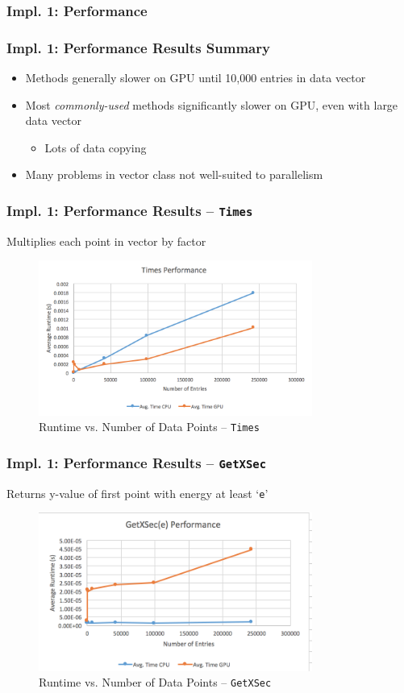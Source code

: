\documentclass{beamer}
\newcommand{\textapprox}{\raisebox{0.5ex}{\texttildelow}}
\begin{document}
\subsubsection{Impl. 1: Performance}
\begin{frame}
\frametitle{Impl. 1: Performance Results Summary}
\begin{itemize}
\item Methods generally slower on GPU until \textapprox 10,000 entries in data vector
\item Most \emph{commonly-used} methods significantly slower on GPU, even with large data vector
\begin{itemize}
\item Lots of data copying
\end{itemize}
\item Many problems in vector class not well-suited to parallelism
\end{itemize}
\end{frame}

\begin{frame}
\frametitle{Impl. 1: Performance Results -- \texttt{Times}}
Multiplies each point in vector by factor
\begin{figure}
\centering
\includegraphics[width=0.8\textwidth]{images/times_line.png}
\caption{Runtime vs. Number of Data Points -- \texttt{Times}}
\end{figure}
\end{frame}

\begin{frame}
\frametitle{Impl. 1: Performance Results -- \texttt{GetXSec}}
Returns y-value of first point with energy at least `\texttt{e}'
\begin{figure}
\centering
\includegraphics[width=0.8\textwidth]{images/getxsec_e_line.png}
\caption{Runtime vs. Number of Data Points -- \texttt{GetXSec}}
\end{figure}
\end{frame}
\end{document}
